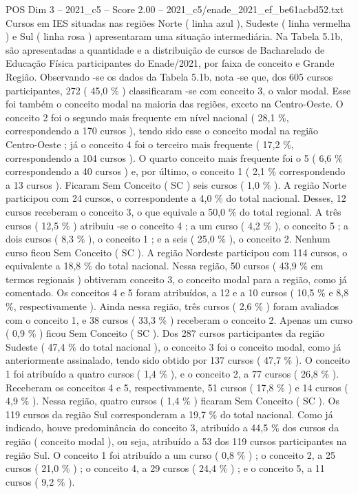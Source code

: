 \begin{textsample}{POS Dim 3 – 2021\_c5 – Score 2.00 – 2021\_c5/enade\_2021\_ef\_be61acbd52.txt}
Cursos em IES situadas nas regiões Norte ( linha azul ), Sudeste ( linha vermelha ) e Sul ( linha rosa ) apresentaram uma situação intermediária.
Na Tabela 5.1b, são apresentadas a quantidade e a distribuição de cursos de Bacharelado de Educação Física participantes do Enade/2021, por faixa de conceito e Grande Região.
Observando -se os dados da Tabela 5.1b, nota -se que, dos 605 cursos participantes, 272 ( 45,0 \% ) classificaram -se com conceito 3, o valor modal.
Esse foi também o conceito modal na maioria das regiões, exceto na Centro-Oeste.
O conceito 2 foi o segundo mais frequente em nível nacional ( 28,1 \%, correspondendo a 170 cursos ), tendo sido esse o conceito modal na região Centro-Oeste ; já o conceito 4 foi o terceiro mais frequente ( 17,2 \%, correspondendo a 104 cursos ).
O quarto conceito mais frequente foi o 5 ( 6,6 \% correspondendo a 40 cursos ) e, por último, o conceito 1 ( 2,1 \% correspondendo a 13 cursos ).
Ficaram Sem Conceito ( SC ) seis cursos ( 1,0 \% ).
A região Norte participou com 24 cursos, o correspondente a 4,0 \% do total nacional.
Desses, 12 cursos receberam o conceito 3, o que equivale a 50,0 \% do total regional.
A três cursos ( 12,5 \% ) atribuiu -se o conceito 4 ; a um curso ( 4,2 \% ), o conceito 5 ; a dois cursos ( 8,3 \% ), o conceito 1 ; e a seis ( 25,0 \% ), o conceito 2.
Nenhum curso ficou Sem Conceito ( SC ).
A região Nordeste participou com 114 cursos, o equivalente a 18,8 \% do total nacional.
Nessa região, 50 cursos ( 43,9 \% em termos regionais ) obtiveram conceito 3, o conceito modal para a região, como já comentado.
Os conceitos 4 e 5 foram atribuídos, a 12 e a 10 cursos ( 10,5 \% e 8,8 \%, respectivamente ).
Ainda nessa região, três cursos ( 2,6 \% ) foram avaliados com o conceito 1, e 38 cursos ( 33,3 \% ) receberam o conceito 2.
Apenas um curso ( 0,9 \% ) ficou Sem Conceito ( SC ).
Dos 287 cursos participantes da região Sudeste ( 47,4 \% do total nacional ), o conceito 3 foi o conceito modal, como já anteriormente assinalado, tendo sido obtido por 137 cursos ( 47,7 \% ).
O conceito 1 foi atribuído a quatro cursos ( 1,4 \% ), e o conceito 2, a 77 cursos ( 26,8 \% ).
Receberam os conceitos 4 e 5, respectivamente, 51 cursos ( 17,8 \% ) e 14 cursos ( 4,9 \% ).
Nessa região, quatro cursos ( 1,4 \% ) ficaram Sem Conceito ( SC ).
Os 119 cursos da região Sul corresponderam a 19,7 \% do total nacional.
Como já indicado, houve predominância do conceito 3, atribuído a 44,5 \% dos cursos da região ( conceito modal ), ou seja, atribuído a 53 dos 119 cursos participantes na região Sul.
O conceito 1 foi atribuído a um curso ( 0,8 \% ) ; o conceito 2, a 25 cursos ( 21,0 \% ) ; o conceito 4, a 29 cursos ( 24,4 \% ) ; e o conceito 5, a 11 cursos ( 9,2 \% ).

\end{textsample}
